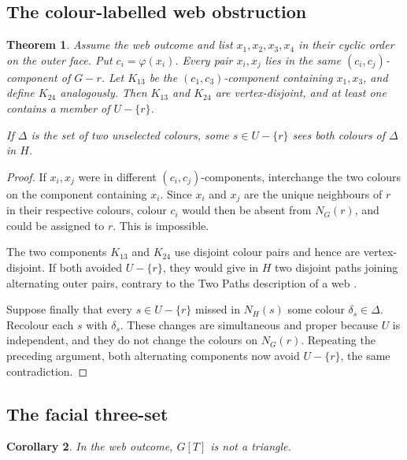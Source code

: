 \documentclass[11pt]{amsart}
\newtheorem{theorem}{Theorem}[section]
\newtheorem{corollary}[theorem]{Corollary}
\begin{document}
\subsection{The colour-labelled web obstruction}

\begin{theorem}\label{thm:centre-kempe}
Assume the web outcome and list $x_1,x_2,x_3,x_4$ in their cyclic order on
the outer face.  Put $c_i=\varphi(x_i)$.  Every pair $x_i,x_j$ lies in the
same $(c_i,c_j)$-component of $G-r$.  Let $K_{13}$ be the
$(c_1,c_3)$-component
containing $x_1,x_3$, and define $K_{24}$ analogously.  Then $K_{13}$ and
$K_{24}$ are vertex-disjoint, and at least one contains a member of
$U-\{r\}$.

If $\Delta$ is the set of two unselected colours, some
$s\in U-\{r\}$ sees both colours of $\Delta$ in $H$.
\end{theorem}

\begin{proof}
If $x_i,x_j$ were in different $(c_i,c_j)$-components, interchange the two
colours on the component containing $x_i$.  Since $x_i$ and $x_j$ are the
unique neighbours of $r$ in their respective colours, colour $c_i$ would
then be absent from $N_G(r)$, and could be assigned to $r$.  This is
impossible.

The two components $K_{13}$ and $K_{24}$ use disjoint colour pairs and
hence are vertex-disjoint.  If both avoided $U-\{r\}$, they would give in
$H$ two disjoint paths joining alternating outer pairs, contrary to the
Two Paths description of a web
\cite[Lemma~2 and the first proof of Lemma~4]{FabilaMonroyWood2013}.

Suppose finally that every $s\in U-\{r\}$ missed in $N_H(s)$ some colour
$\delta_s\in\Delta$.  Recolour each $s$ with $\delta_s$.  These changes
are simultaneous and proper because $U$ is independent, and they do not
change the colours on $N_G(r)$.  Repeating the preceding argument, both
alternating components now avoid $U-\{r\}$, the same contradiction.
\end{proof}

\subsection{The facial three-set}

\begin{corollary}\label{cor:web-boundary-residue}
In the web outcome, $G[T]$ is not a triangle.
\end{corollary}
\end{document}
